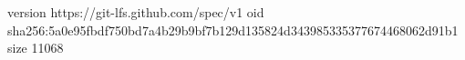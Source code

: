 version https://git-lfs.github.com/spec/v1
oid sha256:5a0e95fbdf750bd7a4b29b9bf7b129d135824d343985335377674468062d91b1
size 11068
